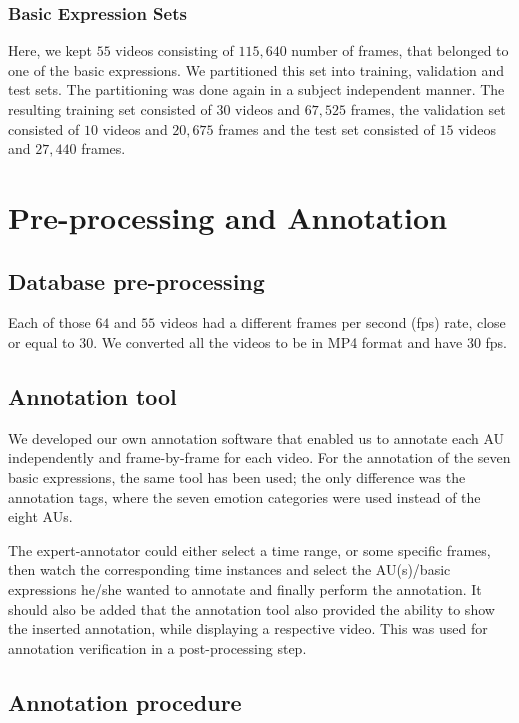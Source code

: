 \documentclass[a4paper, 10pt, conference]{ieeeconf}      %
\begin{document}
\subsubsection{Basic Expression Sets}\label{sets2}

Here, we kept $55$ videos consisting of $115,640$ number of frames, that belonged to one of the basic expressions. We partitioned this set into training, validation and test sets. The partitioning was done again in a subject independent manner. 
The resulting training set consisted of $30$ videos and $67,525$ frames, the validation set consisted of $10$ videos and $20,675$ frames and the test set consisted of $15$ videos and $27,440$ frames.






\section{Pre-processing and Annotation}

\subsection{Database pre-processing}

Each of those $64$ and $55$ videos had a different frames per second (fps) rate, close or equal to 30. We converted all the videos to be in MP4 format and have 30 fps.

\subsection{Annotation tool}

We developed our own annotation software that enabled us to annotate each AU independently and frame-by-frame for each video.
For the annotation of the seven basic expressions, the same tool has been used; the only difference was the annotation tags, where the seven emotion categories were used instead of the eight AUs.

The expert-annotator could either select a time range, or some specific frames, then watch the corresponding time instances and select the AU(s)/basic expressions he/she wanted to annotate and finally perform the annotation. It should also be added that the annotation tool  also provided the ability to show the inserted annotation, while displaying a respective video. This was used for annotation verification in a post-processing step.


\subsection{Annotation procedure}
\end{document}
